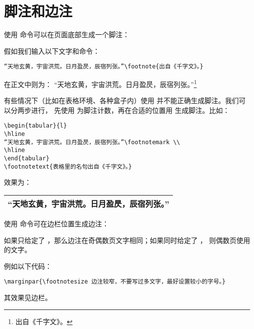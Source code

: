 \section{脚注和边注}\label{sec:footnote-marginpar}

使用  命令可以在页面底部生成一个脚注：
\begin{command}
\end{command}

假如我们输入以下文字和命令：
\begin{verbatim}
“天地玄黄，宇宙洪荒。日月盈昃，辰宿列张。”\footnote{出自《千字文》。}
\end{verbatim}

在正文中则为：%
“天地玄黄，宇宙洪荒。日月盈昃，辰宿列张。”\footnote{出自《千字文》。}

有些情况下（比如在表格环境、各种盒子内）使用  并不能正确生成脚注。我们可以分两步进行，
先使用  为脚注计数，再在合适的位置用  生成脚注。比如：

\begin{verbatim}
\begin{tabular}{l}
\hline
“天地玄黄，宇宙洪荒。日月盈昃，辰宿列张。”\footnotemark \\
\hline
\end{tabular}
\footnotetext{表格里的名句出自《千字文》。}
\end{verbatim}

效果为：

\leavevmode\begin{tabular}{l}
\hline
“天地玄黄，宇宙洪荒。日月盈昃，辰宿列张。”\footnotemark \\
\hline
\end{tabular}

使用  命令可在边栏位置生成边注：
\begin{command}
\end{command}
如果只给定了 ，那么边注在奇偶数页文字相同；如果同时给定了 ，
则偶数页使用  的文字。

例如以下代码：
\begin{verbatim}
\marginpar{\footnotesize 边注较窄，不要写过多文字，最好设置较小的字号。}
\end{verbatim}
其效果见边栏。

